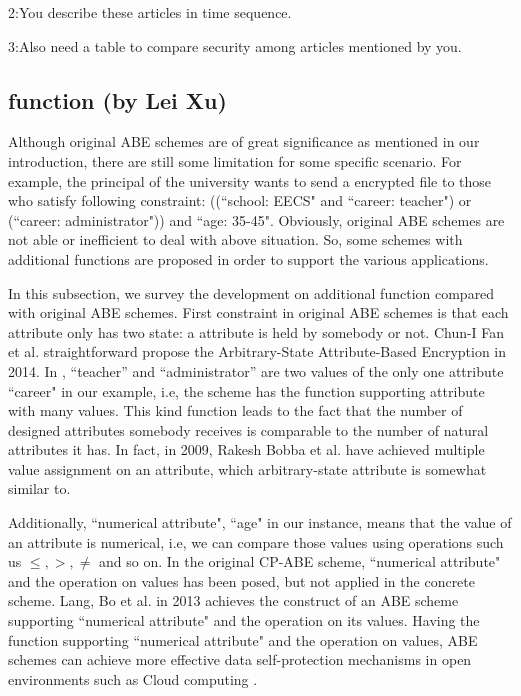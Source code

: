2:You describe these articles in time sequence.

3:Also need a table to compare security among articles mentioned by you.

\subsection{function (by Lei Xu)}
Although original ABE schemes are of great significance as mentioned in our introduction,
there are still some limitation for some specific scenario.
For example, the principal of the university wants to send a encrypted file to those who satisfy following constraint:
((``school: EECS" and ``career: teacher") or (``career: administrator")) and ``age: 35-45".
Obviously, original ABE schemes are not able or inefficient to deal with above situation.
So, some schemes with additional functions are proposed in order to support the various applications.

In this subsection, we survey the development on additional function compared with original ABE schemes.
First constraint in original ABE schemes is that each attribute only has two state: a attribute is held by somebody or not.
Chun-I Fan et al.\cite{Fan:TOC'14} straightforward propose the Arbitrary-State Attribute-Based Encryption in 2014.
In \cite{Fan:TOC'14}, ``teacher'' and ``administrator'' are two values of the only one attribute ``career" in our example,
i.e, the scheme has the function supporting attribute with many values.
This kind function leads to the fact that the number of designed attributes somebody receives is comparable to the number of natural attributes it has.
In fact, in 2009,
Rakesh Bobba et al.\cite{Bobba:ESORICS'09} have achieved multiple value assignment on an attribute, which arbitrary-state attribute is somewhat similar to.

Additionally, ``numerical attribute", ``age" in our instance, means that the value of an attribute is numerical, i.e,
we can compare those values using operations such us $\leq, >, \neq$ and so on.
In the original CP-ABE scheme\cite{Bethencourt:SP'07}, ``numerical attribute" and the operation on values has been posed,
but not applied in the concrete scheme.
Lang, Bo et al.\cite{Lang:SC'13} in 2013 achieves the construct of an ABE scheme supporting ``numerical attribute" and the operation on its values.
Having the function supporting ``numerical attribute" and the operation on values, ABE schemes can achieve more
effective data self-protection mechanisms in open environments such as Cloud computing \cite{Lang:SC'13}.

